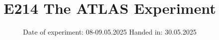 

\subject{}
\title{E214
The ATLAS Experiment}
\date{%
  Date of experiment: 08-09.05.2025
  \hspace{3em}
  Handed in: 30.05.2025
}



\maketitle
\thispagestyle{empty}
\tableofcontents
\newpage





\appendix


\nocite{*}
\printbibliography{}


